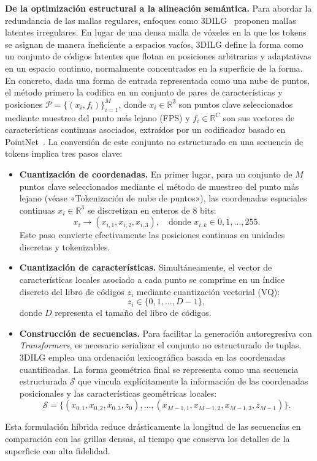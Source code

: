 \documentclass[../../book-main_es.tex]{subfiles}
\begin{document}
\textbf{De la optimización estructural a la alineación semántica.}
Para abordar la redundancia de las mallas regulares, enfoques como
3DILG~\cite{zhang20223dilg} proponen mallas latentes irregulares.
En lugar de una densa malla de vóxeles en la que los tokens se asignan de manera ineficiente
a espacios vacíos, 3DILG define la forma como un conjunto
de códigos latentes que flotan en posiciones arbitrarias y adaptativas
en un espacio continuo, normalmente concentrados en la superficie de la forma.
En concreto, dada una forma de entrada representada como una nube de puntos, el método primero 
la codifica en un conjunto de pares de características y posiciones 
$\mathcal{P} = \{ (x_i, f_i)\}_{i=1}^M$, donde $x_i \in \mathbb{R}^3$ son puntos clave 
seleccionados mediante muestreo del punto más lejano (FPS) y $f_i \in \mathbb{R}^C$ son sus 
vectores de características continuas asociados, extraídos por un codificador basado en 
PointNet~\cite{qi2017pointnet}. La conversión de este conjunto no estructurado en una 
secuencia de tokens implica tres pasos clave:
\begin{itemize}
\item \textbf{Cuantización de coordenadas.} En primer lugar, para un conjunto de $M$ puntos clave
    seleccionados mediante el método de muestreo del punto más lejano (véase «Tokenización de nube de puntos»),
    las coordenadas espaciales continuas $x_i \in
    \mathbb{R}^3$ se discretizan en enteros de 8 bits:
    \begin{equation}
        x_i \rightarrow (x_{i,1}, x_{i,2}, x_{i,3}), \quad
        \text{donde } x_{i,k} \in {0, 1, \dots, 255}.
    \end{equation}
    Este paso convierte efectivamente las posiciones continuas en
    unidades discretas y tokenizables.

\item \textbf{Cuantización de características.} Simultáneamente, el vector de características locales 
asociado a cada punto se comprime en un índice discreto del libro de códigos $z_i$ mediante cuantización vectorial (VQ):
\begin{equation}
    z_i \in \{0, 1, \dots, D-1\},
\end{equation}
donde $D$ representa el tamaño del libro de códigos.

\item \textbf{Construcción de secuencias.} Para facilitar la generación autoregresiva con \textit{Transformers}, 
es necesario serializar el conjunto no estructurado de tuplas. 3DILG emplea una ordenación lexicográfica 
basada en las coordenadas cuantificadas. La forma geométrica final se representa como una secuencia estructurada 
$\mathcal{S}$ que vincula explícitamente la información de las coordenadas posicionales y las 
características geométricas locales:
\begin{equation}
    \mathcal{S} = \big\{ (x_{0,1}, x_{0,2}, x_{0,3}, z_0), \dots, (x_{M-1,1}, x_{M-1,2}, x_{M-1,3}, z_{M-1}) \big\}.
\end{equation}
\end{itemize}
Esta formulación híbrida reduce drásticamente la longitud de las secuencias en comparación con las grillas densas, 
al tiempo que conserva los detalles de la superficie con alta fidelidad.
\end{document}
